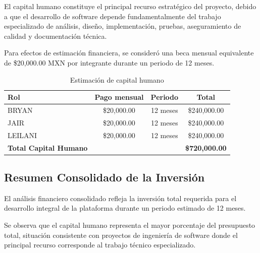 \documentclass[12pt,oneside,letterpaper]{book}
\begin{document}
El capital humano constituye el principal recurso estratégico del proyecto, debido a que el desarrollo de software depende fundamentalmente del trabajo especializado de análisis, diseño, implementación, pruebas, aseguramiento de calidad y documentación técnica.

Para efectos de estimación financiera, se consideró una beca mensual equivalente de \$20,000.00 MXN por integrante durante un periodo de 12 meses.

\begin{table}[H]
\centering
\caption{Estimación de capital humano}

\begin{tabular}{lccc}
\toprule
\rowcolor{headerblue}
\textbf{Rol} & \textbf{Pago mensual} & \textbf{Periodo} & \textbf{Total} \\
\midrule

BRYAN &
\$20,000.00 &
12 meses &
\$240,000.00 \\

JAIR &
\$20,000.00 &
12 meses &
\$240,000.00 \\

LEILANI &
\$20,000.00 &
12 meses &
\$240,000.00 \\

\midrule
\textbf{Total Capital Humano} & & & \textbf{\$720,000.00} \\

\bottomrule
\end{tabular}
\end{table}

\vspace{0.5cm}

\subsection{Resumen Consolidado de la Inversión}

El análisis financiero consolidado refleja la inversión total requerida para el desarrollo integral de la plataforma durante un periodo estimado de 12 meses.

Se observa que el capital humano representa el mayor porcentaje del presupuesto total, situación consistente con proyectos de ingeniería de software donde el principal recurso corresponde al trabajo técnico especializado.
\end{document}
